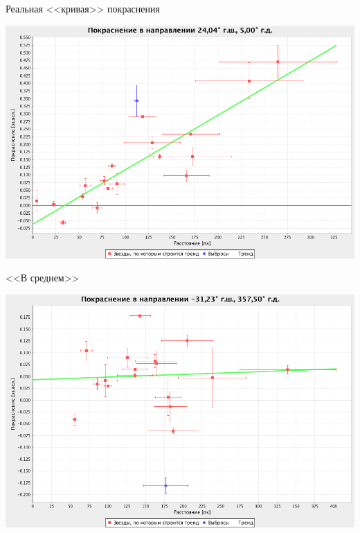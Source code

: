 \documentclass[14pt, fleqn, xcolor={dvipsnames, table}]{beamer}
\begin{document}
        \begin{frame}{Реальная <<кривая>> покраснения}
            \begin{center}
                \includegraphics[scale=0.35]{real-2.png}
            \end{center}             
        \end{frame}
        
        \begin{frame}{<<В среднем>>}
            \begin{center}
                \includegraphics[scale=0.35]{real-3.png}
            \end{center}             
        \end{frame}        
        
\end{document}
